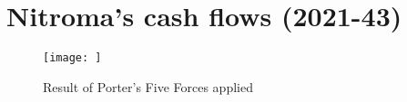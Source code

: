 \section{Nitroma's cash flows (2021-43)}
\label{app:cash-flows-econ}

\begin{figure}[h]
\centering
 \texttt{[image: ]}
 \caption{Result of Porter's Five Forces applied }
 \label{fig:Result of Porter's Five Forces applied to Nitroma}
\end{figure}